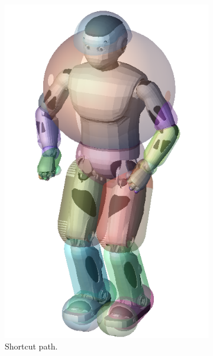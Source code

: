 \begin{figure}
\begin{subfigure}{0.48\columnwidth}
    \includegraphics[width = \columnwidth]
                    {src/chap3-optimal-motion-planning/figure/romeo-bounding-capsule.png}
    \caption{Shortcut path.}
    \label{FIXMEb}
  \end{subfigure}
  \begin{subfigure}{0.48\columnwidth}
    \centering

\end{subfigure}
\end{figure}
